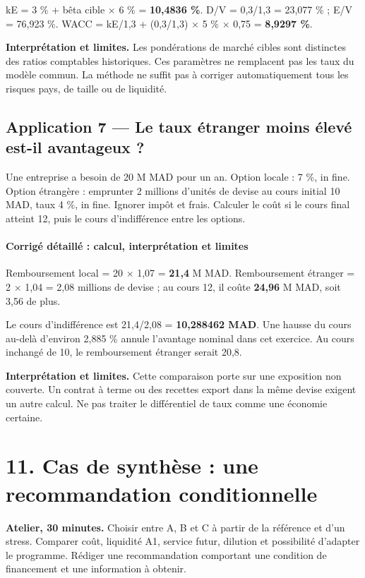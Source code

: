 \documentclass[12pt,a4paper]{article}
\begin{document}
kE = 3 \% + bêta cible $\times$ 6 \% = \textbf{10,4836 \%}. D/V = 0,3/1,3 = 23,077 \% ; E/V = 76,923 \%. WACC = kE/1,3 + (0,3/1,3) $\times$ 5 \% $\times$ 0,75 = \textbf{8,9297 \%}.

\textbf{Interprétation et limites.} Les pondérations de marché cibles sont distinctes des ratios comptables historiques. Ces paramètres ne remplacent pas les taux du modèle commun. La méthode ne suffit pas à corriger automatiquement tous les risques pays, de taille ou de liquidité.


\subsection*{Application 7 --- Le taux étranger moins élevé est-il avantageux ?}
Une entreprise a besoin de 20 M MAD pour un an. Option locale : 7 \%, in fine. Option étrangère : emprunter 2 millions d’unités de devise au cours initial 10 MAD, taux 4 \%, in fine. Ignorer impôt et frais. Calculer le coût si le cours final atteint 12, puis le cours d’indifférence entre les options.


\paragraph{Corrigé détaillé : calcul, interprétation et limites}
Remboursement local = 20 $\times$ 1,07 = \textbf{21,4} M MAD. Remboursement étranger = 2 $\times$ 1,04 = 2,08 millions de devise ; au cours 12, il coûte \textbf{24,96} M MAD, soit 3,56 de plus.

Le cours d’indifférence est 21,4/2,08 = \textbf{10,288462 MAD}. Une hausse du cours au-delà d’environ 2,885 \% annule l’avantage nominal dans cet exercice. Au cours inchangé de 10, le remboursement étranger serait 20,8.

\textbf{Interprétation et limites.} Cette comparaison porte sur une exposition non couverte. Un contrat à terme ou des recettes export dans la même devise exigent un autre calcul. Ne pas traiter le différentiel de taux comme une économie certaine.

\section*{11. Cas de synthèse : une recommandation conditionnelle}
\textbf{Atelier, 30 minutes.} Choisir entre A, B et C à partir de la référence et d’un stress. Comparer coût, liquidité A1, service futur, dilution et possibilité d’adapter le programme. Rédiger une recommandation comportant une condition de financement et une information à obtenir.
\end{document}
